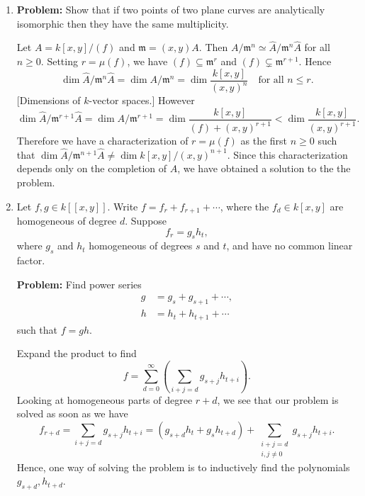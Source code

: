 \begin{enumerate}[label=(\alph*)]
	\item
	\textbf{Problem:} Show that if two points of two plane curves are analytically isomorphic then they have the same multiplicity.
	
	Let $A = k[x,y]/(f)$ and $\mathfrak{m} = (x,y)A$. Then $A/\mathfrak{m}^n \simeq \hat{A}/\mathfrak{m}^n\hat{A}$ for all $n \geq 0$. Setting $r = \mu(f)$, we have $(f) \subseteq \mathfrak{m}^r$ and $(f) \subsetneq \mathfrak{m}^{r+1}$. Hence
	\begin{equation*}
		\dim \hat{A}/\mathfrak{m}^n\hat{A} = \dim A/\mathfrak{m}^n = \dim \frac{k[x,y]}{(x,y)^n} \quad \text{for all } n \leq r.
	\end{equation*}
	[Dimensions of $k$-vector spaces.]
	However
	\begin{equation*}
		\dim \hat{A}/\mathfrak{m}^{r+1}\hat{A} = \dim A/\mathfrak{m}^{r+1} = \dim \frac{k[x,y]}{(f)+(x,y)^{r+1}} < \dim \frac{k[x,y]}{(x,y)^{r+1}}.
	\end{equation*}
	Therefore we have a characterization of $r=\mu(f)$ as the first $n \geq 0$ such that $\dim \hat{A}/\mathfrak{m}^{n+1}\hat{A} \ne \dim k[x,y]/(x,y)^{n+1}$. Since this characterization depends only on the completion of $A$, we have obtained a solution to the the problem.
	
	\item Let $f,g \in k[[x,y]]$. Write $f = f_r + f_{r+1} + \cdots$,
	where the $f_d \in k[x,y]$ are homogeneous of degree $d$.
	Suppose
	\[ f_r = g_sh_t, \]
	where $g_s$ and $h_t$ homogeneous of degrees $s$ and $t$, and have no common linear factor.
	
	\textbf{Problem:} Find power series
	\begin{align*}
		g &= g_s + g_{s+1} + \cdots, \\
		h &= h_t + h_{t+1} + \cdots
	\end{align*}
	such that $f=gh$.
	
	Expand the product to find
	\begin{equation*}
		f = \sum_{d=0}^\infty \left( \sum_{i+j=d} g_{s+j}h_{t+i} \right).
	\end{equation*}
	Looking at homogeneous parts of degree $r+d$, we see that our problem is solved as soon as we have
	\begin{equation} \label{eq:frd}
		f_{r+d} = \sum_{i+j=d} g_{s+j}h_{t+i} = (g_{s+d}h_t + g_sh_{t+d}) + \sum_{\substack{i+j=d\\ i,j \ne 0}} g_{s+j}h_{t+i}.
	\end{equation}
	Hence, one way of solving the problem is to inductively find the polynomials $g_{s+d}, h_{t+d}$.
	

\end{enumerate}
